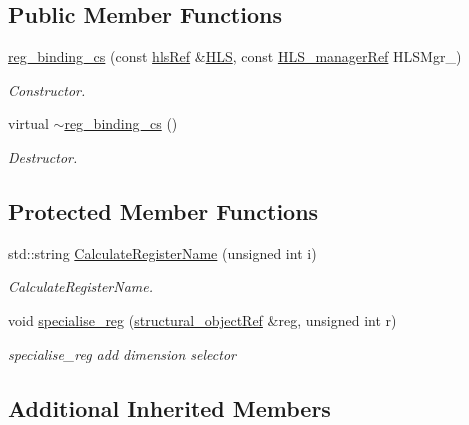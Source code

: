 \subsection*{Public Member Functions}
\begin{DoxyCompactItemize}
\item 
\hyperlink{classreg__binding__cs_a1faf5be630eda47bc3a37efc307510f0}{reg\+\_\+binding\+\_\+cs} (const \hyperlink{hls_8hpp_a75d0c73923d0ddfa28c4843a802c73a7}{hls\+Ref} \&\hyperlink{classreg__binding_ab715d356b916ed5376a21628b556ef71}{H\+LS}, const \hyperlink{hls__manager_8hpp_acd3842b8589fe52c08fc0b2fcc813bfe}{H\+L\+S\+\_\+manager\+Ref} H\+L\+S\+Mgr\+\_\+)
\begin{DoxyCompactList}\small\item\em Constructor. \end{DoxyCompactList}\item 
virtual \hyperlink{classreg__binding__cs_a6d1af862f3a2efe11115cedaa4c5fca1}{$\sim$reg\+\_\+binding\+\_\+cs} ()
\begin{DoxyCompactList}\small\item\em Destructor. \end{DoxyCompactList}\end{DoxyCompactItemize}
\subsection*{Protected Member Functions}
\begin{DoxyCompactItemize}
\item 
std\+::string \hyperlink{classreg__binding__cs_a15bf6e04843ef122e38b1dfd8a118801}{Calculate\+Register\+Name} (unsigned int i)
\begin{DoxyCompactList}\small\item\em Calculate\+Register\+Name. \end{DoxyCompactList}\item 
void \hyperlink{classreg__binding__cs_acb0a006d620a6320239cc3973cf2198c}{specialise\+\_\+reg} (\hyperlink{structural__objects_8hpp_a8ea5f8cc50ab8f4c31e2751074ff60b2}{structural\+\_\+object\+Ref} \&reg, unsigned int r)
\begin{DoxyCompactList}\small\item\em specialise\+\_\+reg add dimension selector \end{DoxyCompactList}\end{DoxyCompactItemize}
\subsection*{Additional Inherited Members}


